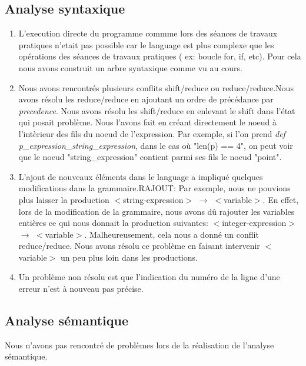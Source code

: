 \documentclass[a4paper, 12pt]{article}
\begin{document}
    \subsection{Analyse syntaxique}
        \begin{enumerate}
            \item L'execution directe du programme commme lors des séances de travaux pratiques n'etait pas possible car le language est plus complexe que les opérations des séances de travaux pratiques ( ex: boucle for, if, etc). Pour cela nous avons construit un arbre syntaxique comme vu au cours.
            
            \item Nous avons rencontrés plusieurs conflits shift/reduce ou reduce/reduce.Nous avons résolu les reduce/reduce en ajoutant un ordre de précédance par \textit{precedence}.
            Nous avons résolu les shift/reduce en enlevant le shift dans l'état qui posait problème. Nous l'avons fait en créant directement le noeud à l'intèrieur des fils du noeud de l'expression. Par exemple, si l'on prend \textit{def p\_expression\_string\_expression}, dans le cas où "len(p) == 4", on peut voir que le noeud "string\_expression" contient parmi ses fils le noeud "point".
            
            \item L'ajout de nouveaux éléments dans le language a impliqué quelques modifications dans la grammaire.RAJOUT: Par exemple, nous ne pouvions plus laisser la production $<$string-expression$>$ $\longrightarrow$ $<$variable$>$. En effet, lors de la modification de la grammaire, nous avons dû rajouter les variables entières ce qui nous donnait la production suivantes: $<$integer-expression$>$ $\longrightarrow$ $<$variable$>$. Malheureusement, cela nous a donné un conflit reduce/reduce. Nous avons résolu ce problème en faisant intervenir $<$variable$>$ un peu plus loin dans les productions.
            
            \item Un problème non résolu est que l'indication du numéro de la ligne d'une erreur n'est à nouveau pas précise.
            
        \end{enumerate}
    \subsection{Analyse sémantique}
    Nous n'avons pas rencontré de problèmes lors de la réalisation de l'analyse sémantique.
\end{document}
